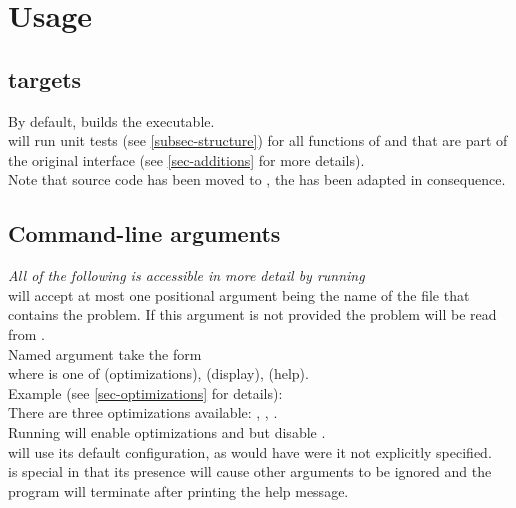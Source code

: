 \section{Usage}\label{sec-usage}

\subsection{ targets}

By default,  builds the  executable.\\
 will run unit tests (see \ref{subsec-structure}) for all functions of
 and  that are part of the original
interface (see \ref{sec-additions} for more details).\\

Note that source code has been moved to , the  has
been adapted in consequence.

\subsection{Command-line arguments}

\textit{All of the following is accessible in more detail by running
}\\

 will accept at most one positional argument being the name of the
file that contains the problem. If this argument is not provided the problem will
be read from .\\

Named argument take the form \ttt{-[CATEGORY][FLAGS]}\\
where  is one of  (optimizations),  (display),  (help).\\

Example (see \ref{sec-optimizations} for details):\\
There are three optimizations available: , , .\\
Running  will enable optimizations  and 
but disable .\\
 will use its default configuration, as would have  were it not
explicitly specified.\\

 is special in that its presence will cause other arguments to be ignored
and the program will terminate after printing the help message.\\


